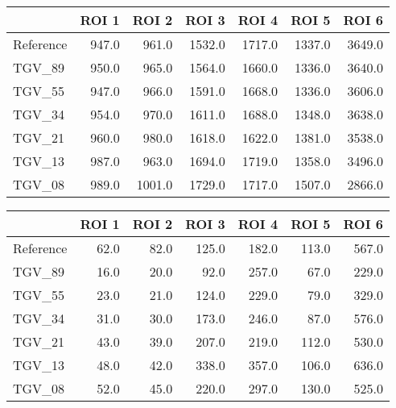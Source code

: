\begin{tabular}{lrrrrrr}
\toprule
{} &  ROI 1 &   ROI 2 &   ROI 3 &   ROI 4 &   ROI 5 &   ROI 6 \\
\midrule
Reference &  947.0 &   961.0 &  1532.0 &  1717.0 &  1337.0 &  3649.0 \\
TGV\_89    &  950.0 &   965.0 &  1564.0 &  1660.0 &  1336.0 &  3640.0 \\
TGV\_55    &  947.0 &   966.0 &  1591.0 &  1668.0 &  1336.0 &  3606.0 \\
TGV\_34    &  954.0 &   970.0 &  1611.0 &  1688.0 &  1348.0 &  3638.0 \\
TGV\_21    &  960.0 &   980.0 &  1618.0 &  1622.0 &  1381.0 &  3538.0 \\
TGV\_13    &  987.0 &   963.0 &  1694.0 &  1719.0 &  1358.0 &  3496.0 \\
TGV\_08    &  989.0 &  1001.0 &  1729.0 &  1717.0 &  1507.0 &  2866.0 \\
\bottomrule
\end{tabular}
\begin{tabular}{lrrrrrr}
\toprule
{} &  ROI 1 &  ROI 2 &  ROI 3 &  ROI 4 &  ROI 5 &  ROI 6 \\
\midrule
Reference &   62.0 &   82.0 &  125.0 &  182.0 &  113.0 &  567.0 \\
TGV\_89    &   16.0 &   20.0 &   92.0 &  257.0 &   67.0 &  229.0 \\
TGV\_55    &   23.0 &   21.0 &  124.0 &  229.0 &   79.0 &  329.0 \\
TGV\_34    &   31.0 &   30.0 &  173.0 &  246.0 &   87.0 &  576.0 \\
TGV\_21    &   43.0 &   39.0 &  207.0 &  219.0 &  112.0 &  530.0 \\
TGV\_13    &   48.0 &   42.0 &  338.0 &  357.0 &  106.0 &  636.0 \\
TGV\_08    &   52.0 &   45.0 &  220.0 &  297.0 &  130.0 &  525.0 \\
\bottomrule
\end{tabular}
